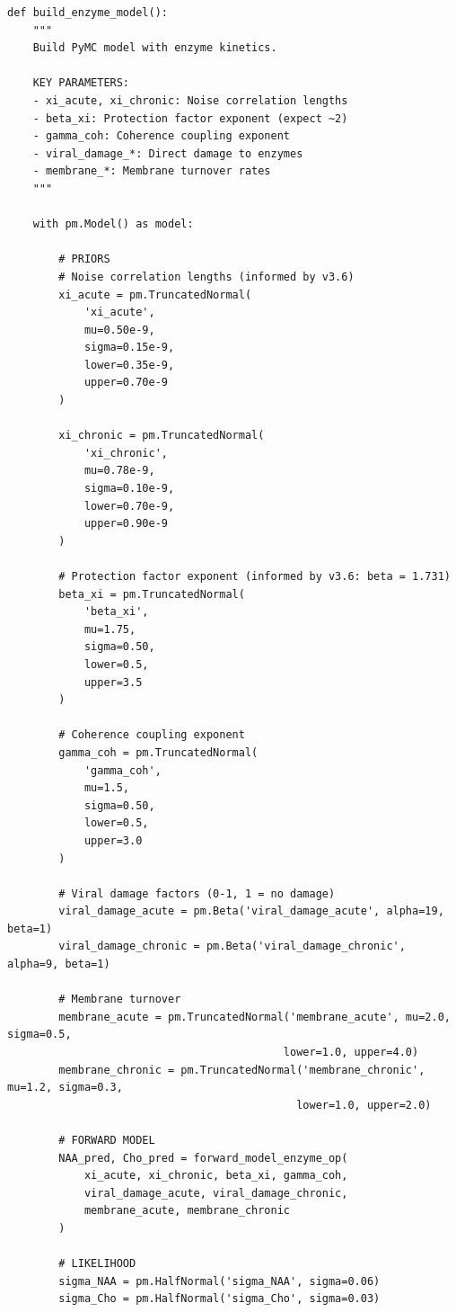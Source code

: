 \documentclass[11pt]{article}
\begin{document}
\begin{lstlisting}[caption={Enzyme Kinetics Model - PyMC Model (Lines 172--314)}]
def build_enzyme_model():
    """
    Build PyMC model with enzyme kinetics.

    KEY PARAMETERS:
    - xi_acute, xi_chronic: Noise correlation lengths
    - beta_xi: Protection factor exponent (expect ~2)
    - gamma_coh: Coherence coupling exponent
    - viral_damage_*: Direct damage to enzymes
    - membrane_*: Membrane turnover rates
    """

    with pm.Model() as model:

        # PRIORS
        # Noise correlation lengths (informed by v3.6)
        xi_acute = pm.TruncatedNormal(
            'xi_acute',
            mu=0.50e-9,
            sigma=0.15e-9,
            lower=0.35e-9,
            upper=0.70e-9
        )

        xi_chronic = pm.TruncatedNormal(
            'xi_chronic',
            mu=0.78e-9,
            sigma=0.10e-9,
            lower=0.70e-9,
            upper=0.90e-9
        )

        # Protection factor exponent (informed by v3.6: beta = 1.731)
        beta_xi = pm.TruncatedNormal(
            'beta_xi',
            mu=1.75,
            sigma=0.50,
            lower=0.5,
            upper=3.5
        )

        # Coherence coupling exponent
        gamma_coh = pm.TruncatedNormal(
            'gamma_coh',
            mu=1.5,
            sigma=0.50,
            lower=0.5,
            upper=3.0
        )

        # Viral damage factors (0-1, 1 = no damage)
        viral_damage_acute = pm.Beta('viral_damage_acute', alpha=19, beta=1)
        viral_damage_chronic = pm.Beta('viral_damage_chronic', alpha=9, beta=1)

        # Membrane turnover
        membrane_acute = pm.TruncatedNormal('membrane_acute', mu=2.0, sigma=0.5,
                                           lower=1.0, upper=4.0)
        membrane_chronic = pm.TruncatedNormal('membrane_chronic', mu=1.2, sigma=0.3,
                                             lower=1.0, upper=2.0)

        # FORWARD MODEL
        NAA_pred, Cho_pred = forward_model_enzyme_op(
            xi_acute, xi_chronic, beta_xi, gamma_coh,
            viral_damage_acute, viral_damage_chronic,
            membrane_acute, membrane_chronic
        )

        # LIKELIHOOD
        sigma_NAA = pm.HalfNormal('sigma_NAA', sigma=0.06)
        sigma_Cho = pm.HalfNormal('sigma_Cho', sigma=0.03)


\end{lstlisting}
\end{document}
